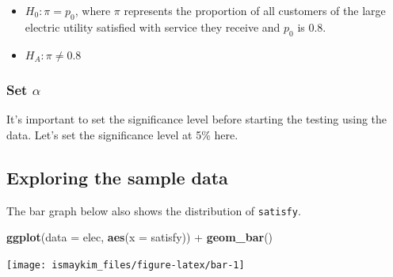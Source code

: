 \documentclass[]{tufte-book}
\newenvironment{Shaded}{\begin{snugshade}}{\end{snugshade}}
\newcommand{\KeywordTok}[1]{\textcolor[rgb]{0.13,0.29,0.53}{\textbf{{#1}}}}
\newcommand{\DataTypeTok}[1]{\textcolor[rgb]{0.13,0.29,0.53}{{#1}}}
\newcommand{\DecValTok}[1]{\textcolor[rgb]{0.00,0.00,0.81}{{#1}}}
\newcommand{\StringTok}[1]{\textcolor[rgb]{0.31,0.60,0.02}{{#1}}}
\newcommand{\NormalTok}[1]{{#1}}
\providecommand{\tightlist}{%
  \setlength{\itemsep}{0pt}\setlength{\parskip}{0pt}}
\begin{document}
\begin{itemize}
\tightlist
\item
  \(H_0: \pi = p_{0}\), where \(\pi\) represents the proportion of all
  customers of the large electric utility satisfied with service they
  receive and \(p_0\) is 0.8.
\item
  \(H_A: \pi \ne 0.8\)
\end{itemize}

\subsubsection{\texorpdfstring{Set
\(\alpha\)}{Set \textbackslash{}alpha}}\label{set-alpha-1}

It's important to set the significance level before starting the testing
using the data. Let's set the significance level at 5\% here.

\subsection{Exploring the sample
data}\label{exploring-the-sample-data-1}

\begin{Shaded}
\end{Shaded}

The bar graph below also shows the distribution of \texttt{satisfy}.

\begin{Shaded}
\begin{Highlighting}[]
\KeywordTok{ggplot}\NormalTok{(}\DataTypeTok{data =} \NormalTok{elec, }\KeywordTok{aes}\NormalTok{(}\DataTypeTok{x =} \NormalTok{satisfy)) +}\StringTok{ }\KeywordTok{geom_bar}\NormalTok{()}
\end{Highlighting}
\end{Shaded}

\begin{center}\texttt{[image: ismaykim\_files/figure-latex/bar-1]} \end{center}
\end{document}
